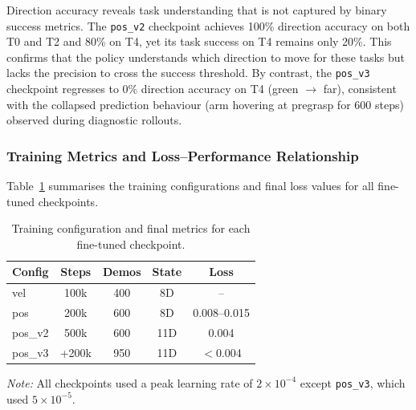 \documentclass[conference, 12pt]{IEEEtran}
\begin{document}
Direction accuracy reveals task understanding that is not captured by binary
success metrics.
The \texttt{pos\_v2} checkpoint achieves 100\% direction accuracy on both T0
and T2 and 80\% on T4, yet its task success on T4 remains only 20\%.
This confirms that the policy understands which direction to move for these tasks
but lacks the precision to cross the success threshold.
By contrast, the \texttt{pos\_v3} checkpoint regresses to 0\% direction
accuracy on T4 (green $\to$ far), consistent with the collapsed prediction
behaviour (arm hovering at pregrasp for 600 steps) observed during diagnostic
rollouts.

\subsubsection{Training Metrics and Loss--Performance Relationship}

Table~\ref{tab:training} summarises the training configurations and final
loss values for all fine-tuned checkpoints.

\begin{table}[t]
\centering
\caption{Training configuration and final metrics for each fine-tuned checkpoint.}
\label{tab:training}
\small

\begin{tabular}{@{}lcccc@{}}
\toprule
\textbf{Config} & \textbf{Steps} & \textbf{Demos} &
\textbf{State} & \textbf{Loss} \\
\midrule
vel      & 100k   & 400 & 8D  & -- \\
pos      & 200k   & 600 & 8D  & 0.008--0.015 \\
pos\_v2  & 500k   & 600 & 11D & 0.004 \\
pos\_v3  & +200k  & 950 & 11D & $<$0.004 \\
\bottomrule
\end{tabular}

\vspace{1mm}

\begin{minipage}{\columnwidth}
\footnotesize
\textit{Note:} All checkpoints used a peak learning rate of
$2\times10^{-4}$ except \texttt{pos\_v3}, which used $5\times10^{-5}$.
\end{minipage}

\end{table}
\end{document}

